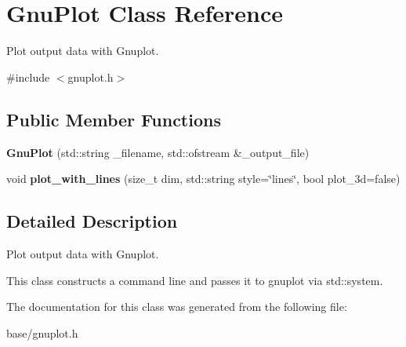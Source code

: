 \hypertarget{classGnuPlot}{}\section{Gnu\+Plot Class Reference}
\label{classGnuPlot}


Plot output data with Gnuplot.  




{\ttfamily \#include $<$gnuplot.\+h$>$}

\subsection*{Public Member Functions}
\begin{DoxyCompactItemize}
\item 
\mbox{\label{classGnuPlot_ab76925e10c41c54c30e9d96553febdda}} 
{\bfseries Gnu\+Plot} (std\+::string \+\_\+filename, std\+::ofstream \&\+\_\+output\+\_\+file)
\item 
\mbox{\label{classGnuPlot_aea47640d0d3b69e2325489e62ca203fd}} 
void {\bfseries plot\+\_\+with\+\_\+lines} (size\+\_\+t dim, std\+::string style=\char`\"{}lines\char`\"{}, bool plot\+\_\+3d=false)
\end{DoxyCompactItemize}


\subsection{Detailed Description}
Plot output data with Gnuplot. 

This class constructs a command line and passes it to gnuplot via {\ttfamily std\+::system}. 

The documentation for this class was generated from the following file\+:\begin{DoxyCompactItemize}
\item 
base/gnuplot.\+h\end{DoxyCompactItemize}
